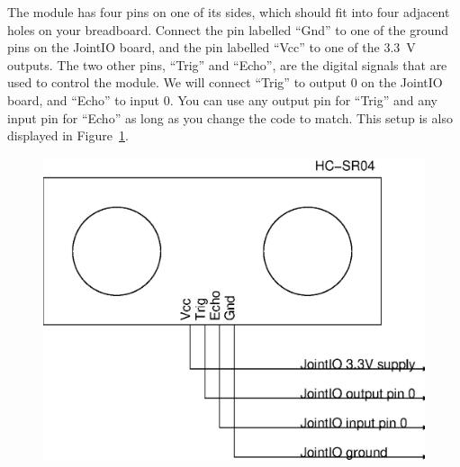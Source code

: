 \documentclass{article}
\begin{document}
The module has four pins on one of its sides, which should fit into four
adjacent holes on your breadboard. Connect the pin labelled ``Gnd'' to one of
the ground pins on the JointIO board, and the pin labelled ``Vcc'' to one of the
\SI{3.3}{\volt} outputs. The two other pins, ``Trig'' and ``Echo'', are the
digital signals that are used to control the module. We will connect ``Trig''
to output 0 on the JointIO board, and ``Echo'' to input 0. You can use any
output pin for ``Trig'' and any input pin for ``Echo'' as long as you change the
code to match. This setup is also displayed in
Figure~\ref{fig:schem:ultra-jointio}.

\begin{figure}[h]
\centering
\includegraphics[scale=.7]{assets/fig/schem/ultra-jointio}
\label{fig:schem:ultra-jointio}
\end{figure}


\end{document}
